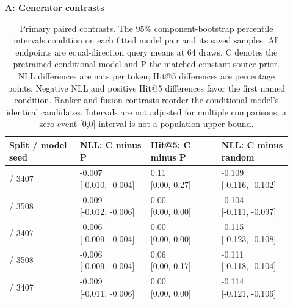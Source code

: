 \documentclass[12pt]{article}
\begin{document}
\begin{table}[!htbp]
\centering
\caption{Primary paired contrasts. The 95\% component-bootstrap percentile intervals condition on each fitted model pair and its saved samples. All endpoints are equal-direction query means at 64 draws. C denotes the pretrained conditional model and P the matched constant-source prior. NLL differences are nats per token; Hit@5 differences are percentage points. Negative NLL and positive Hit@5 differences favor the first named condition. Ranker and fusion contrasts reorder the conditional model's identical candidates. Intervals are not adjusted for multiple comparisons; a zero-event [0,0] interval is not a population upper bound.}
\label{tab:paired}
\small
\setlength{\tabcolsep}{3pt}
\par\smallskip\noindent\textbf{A: Generator contrasts}\par\smallskip
\begin{tabular}{@{}>{\raggedright\arraybackslash}p{0.23\linewidth}>{\raggedright\arraybackslash}p{0.23\linewidth}>{\raggedright\arraybackslash}p{0.23\linewidth}>{\raggedright\arraybackslash}p{0.23\linewidth}@{}}
\toprule
Split / model seed & NLL: C minus P & Hit@5: C minus P & NLL: C minus random\\
\midrule
17 / 3407 & \shortstack[l]{-0.007\\{}[-0.010, -0.004]} & \shortstack[l]{0.11\\{}[0.00, 0.27]} & \shortstack[l]{-0.109\\{}[-0.116, -0.102]}\\[3pt]
17 / 3508 & \shortstack[l]{-0.009\\{}[-0.012, -0.006]} & \shortstack[l]{0.00\\{}[0.00, 0.00]} & \shortstack[l]{-0.104\\{}[-0.111, -0.097]}\\[3pt]
3407 / 3407 & \shortstack[l]{-0.006\\{}[-0.009, -0.004]} & \shortstack[l]{0.00\\{}[0.00, 0.00]} & \shortstack[l]{-0.115\\{}[-0.123, -0.108]}\\[3pt]
3407 / 3508 & \shortstack[l]{-0.006\\{}[-0.009, -0.004]} & \shortstack[l]{0.06\\{}[0.00, 0.17]} & \shortstack[l]{-0.111\\{}[-0.118, -0.104]}\\[3pt]
2026 / 3407 & \shortstack[l]{-0.009\\{}[-0.011, -0.006]} & \shortstack[l]{0.00\\{}[0.00, 0.00]} & \shortstack[l]{-0.114\\{}[-0.121, -0.106]}\\[3pt]

\end{tabular}
\end{table}
\end{document}
